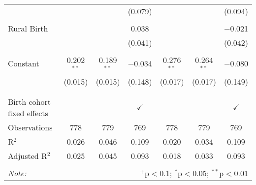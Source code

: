 \begin{table}[!htbp]
\begin{tabular}{@{\extracolsep{5pt}}lcccccc}
  &  &  & (0.079) &  &  & (0.094) \\ 
  & & & & & & \\ 
 Rural Birth &  &  & 0.038 &  &  & $-$0.021 \\ 
  &  &  & (0.041) &  &  & (0.042) \\ 
  & & & & & & \\ 
 Constant & 0.202$^{**}$ & 0.189$^{**}$ & $-$0.034 & 0.276$^{**}$ & 0.264$^{**}$ & $-$0.080 \\ 
  & (0.015) & (0.015) & (0.148) & (0.017) & (0.017) & (0.149) \\ 
  & & & & & & \\ 
\hline \\[-1.8ex] 
Birth cohort fixed effects &  &  & $\checkmark$ &  &  & $\checkmark$ \\ 
Observations & 778 & 779 & 769 & 778 & 779 & 769 \\ 
R$^{2}$ & 0.026 & 0.046 & 0.109 & 0.020 & 0.034 & 0.109 \\ 
Adjusted R$^{2}$ & 0.025 & 0.045 & 0.093 & 0.018 & 0.033 & 0.093 \\ 
\hline 
\hline \\[-1.8ex] 
\textit{Note:}  & \multicolumn{6}{r}{$^{+}$p$<$0.1; $^{*}$p$<$0.05; $^{**}$p$<$0.01}} \\ 
\end{tabular} 
\end{table} 
